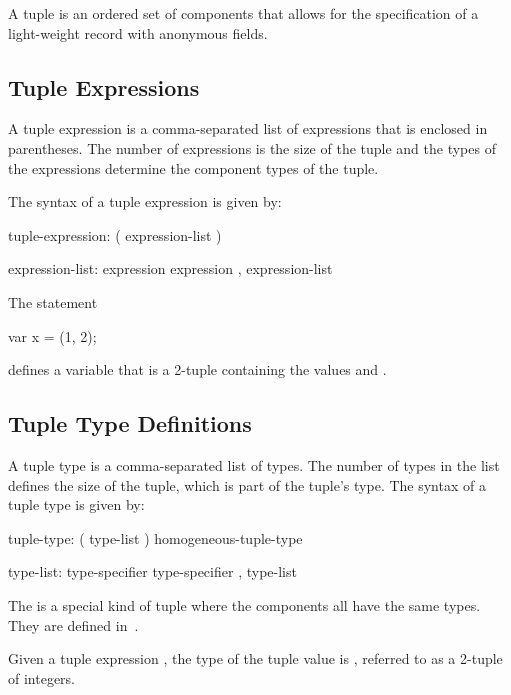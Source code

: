 \label{Tuples}

A tuple is an ordered set of components that allows for the
specification of a light-weight record with anonymous fields.

\subsection{Tuple Expressions}
\label{Tuple_Expressions}

A tuple expression is a comma-separated list of expressions that is
enclosed in parentheses.  The number of expressions is the size of the
tuple and the types of the expressions determine the component types
of the tuple.

The syntax of a tuple expression is given by:
\begin{syntax}
tuple-expression:
  ( expression-list )

expression-list:
  expression
  expression , expression-list
\end{syntax}

\begin{example}
The statement
\begin{chapel}
var x = (1, 2);
\end{chapel}
defines a variable  that is a 2-tuple containing the values
 and .
\end{example}

\subsection{Tuple Type Definitions}
\label{Tuple_Type_Definitions}

A tuple type is a comma-separated list of types.  The number of types
in the list defines the size of the tuple, which is part of the
tuple's type.  The syntax of a tuple type is given by:
\begin{syntax}
tuple-type:
  ( type-list )
  homogeneous-tuple-type

type-list:
  type-specifier
  type-specifier , type-list
\end{syntax}

The  is a special kind of tuple where the
components all have the same types.  They are defined
in~.

\begin{example}
Given a tuple expression , the type of the tuple value is
, referred to as a 2-tuple of integers.
\end{example}


